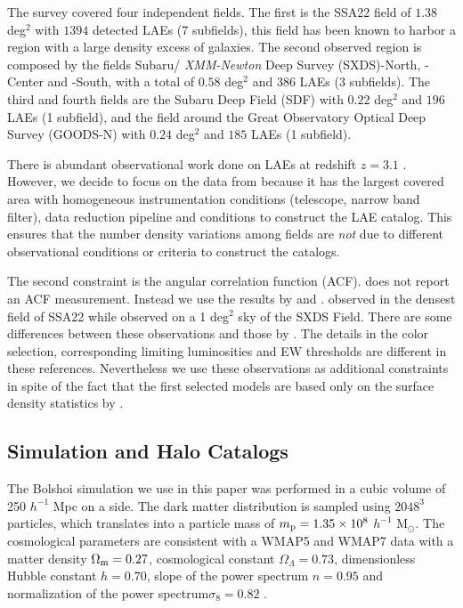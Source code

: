 \documentclass[usenatbib]{mn2e}
\begin{document}
The survey covered four independent fields. The first is the SSA22
field of $1.38$ deg$^2$ with $1394$ detected LAEs (7 subfields), this
field has been known to harbor a region with a large density excess of
galaxies. The second observed region is composed by the fields Subaru/{\it
  XMM-Newton} Deep Survey (SXDS)-North, -Center and -South, with a
total of $0.58$ deg$^2$ and $386$ LAEs (3 subfields). The third and
fourth fields are the Subaru Deep Field (SDF) with $0.22$ deg$^2$ and
$196$ LAEs (1 subfield), and the field around the Great Observatory
Optical Deep Survey  (GOODS-N) with $0.24$ deg$^2$ and $185$ LAEs (1
subfield).  

There is abundant observational work done on LAEs at redshift $z=3.1$
\citep{Kudritzki2000,Matsuda2005,Gawiser2007,Nilsson2007,Ouchi2008}.
However, we decide to focus on the data from \cite{Yamada2012} because
it has the largest covered area with homogeneous instrumentation
conditions (telescope, narrow band filter), data reduction pipeline
and conditions to construct the LAE catalog. This ensures that the
number density variations among fields are \emph{not} due to different
observational conditions or criteria to construct the catalogs.

The second constraint is the angular correlation function
(ACF). \cite{Yamada2012} does not report an ACF measurement. Instead
we use the results by \cite{Hayashino2004} and
\cite{Ouchi2008,Ouchi2010}. \cite{Hayashino2004} observed in the
densest field of SSA22 while \cite{Ouchi2008} observed on a 1 deg$^2$
sky of the SXDS Field.  There are some differences between these
observations and those by \cite{Yamada2012}. The details in the color
selection, corresponding limiting luminosities and EW thresholds are
different in these references. Nevertheless we use these observations
as additional constraints in spite of the fact that the first selected
models are based only on the surface density statistics by
\citep{Yamada2012}.  





\subsection{Simulation and Halo Catalogs}

The Bolshoi simulation \citep{Bolshoi} we use in this paper was
performed in a cubic volume of 250 $h^{-1}$ Mpc on a side. The
dark matter distribution is sampled using $2048^{3}$ particles, which
translates into a particle mass of $m_{\rm   p}=1.35\times 10^{8}$
$h^{-1}$ M$_{\odot}$.  The cosmological parameters are consistent with
a WMAP5 and WMAP7 data with a matter density $\Omega_{\rm m} = 0.27$,
cosmological constant $\Omega_{\Lambda}=0.73$, dimensionless Hubble constant
$h=0.70$, slope of the power spectrum $n=0.95$ and normalization of the
power spectrum$\sigma_{8}=0.82$ \citep{Komatsu2009,Jarosik2011}.  
\end{document}
